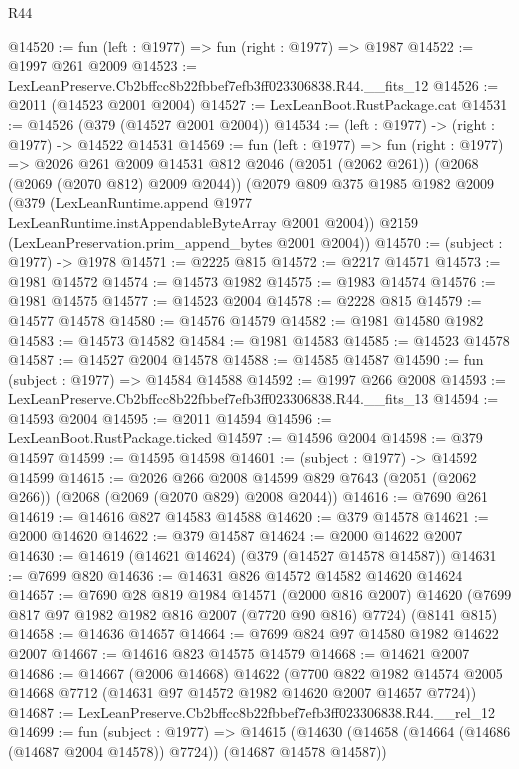 \begin{lexlean}{R44}
\begin{coremodule}
@14520 := fun (left : @1977) => fun (right : @1977) => @1987
@14522 := @1997 @261 @2009
@14523 := LexLeanPreserve.Cb2bffcc8b22fbbef7efb3ff023306838.R44.__fits_12
@14526 := @2011 (@14523 @2001 @2004)
@14527 := LexLeanBoot.RustPackage.cat
@14531 := @14526 (@379 (@14527 @2001 @2004))
@14534 := (left : @1977) -> (right : @1977) -> @14522 @14531
@14569 := fun (left : @1977) =>
  fun (right : @1977) =>
  @2026
    @261
    @2009
    @14531
    @812
    @2046
    (@2051 (@2062 @261))
    (@2068 (@2069 (@2070 @812) @2009 @2044))
    (@2079
      @809
      @375
      @1985
      @1982
      @2009
      (@379 (LexLeanRuntime.append @1977 LexLeanRuntime.instAppendableByteArray @2001 @2004))
      @2159
      (LexLeanPreservation.prim_append_bytes @2001 @2004))
@14570 := (subject : @1977) -> @1978
@14571 := @2225 @815
@14572 := @2217 @14571
@14573 := @1981 @14572
@14574 := @14573 @1982
@14575 := @1983 @14574
@14576 := @1981 @14575
@14577 := @14523 @2004
@14578 := @2228 @815
@14579 := @14577 @14578
@14580 := @14576 @14579
@14582 := @1981 @14580 @1982
@14583 := @14573 @14582
@14584 := @1981 @14583
@14585 := @14523 @14578
@14587 := @14527 @2004 @14578
@14588 := @14585 @14587
@14590 := fun (subject : @1977) => @14584 @14588
@14592 := @1997 @266 @2008
@14593 := LexLeanPreserve.Cb2bffcc8b22fbbef7efb3ff023306838.R44.__fits_13
@14594 := @14593 @2004
@14595 := @2011 @14594
@14596 := LexLeanBoot.RustPackage.ticked
@14597 := @14596 @2004
@14598 := @379 @14597
@14599 := @14595 @14598
@14601 := (subject : @1977) -> @14592 @14599
@14615 := @2026
    @266
    @2008
    @14599
    @829
    @7643
    (@2051 (@2062 @266))
    (@2068 (@2069 (@2070 @829) @2008 @2044))
@14616 := @7690 @261
@14619 := @14616 @827 @14583 @14588
@14620 := @379 @14578
@14621 := @2000 @14620
@14622 := @379 @14587
@14624 := @2000 @14622 @2007
@14630 := @14619 (@14621 @14624) (@379 (@14527 @14578 @14587))
@14631 := @7699 @820
@14636 := @14631 @826 @14572 @14582 @14620 @14624
@14657 := @7690
    @28
    @819
    @1984
    @14571
    (@2000 @816 @2007)
    @14620
    (@7699 @817 @97 @1982 @1982 @816 @2007 (@7720 @90 @816) @7724)
    (@8141 @815)
@14658 := @14636 @14657
@14664 := @7699 @824 @97 @14580 @1982 @14622 @2007
@14667 := @14616 @823 @14575 @14579
@14668 := @14621 @2007
@14686 := @14667
    (@2006 @14668)
    @14622
    (@7700 @822 @1982 @14574 @2005 @14668 @7712 (@14631 @97 @14572 @1982 @14620 @2007 @14657 @7724))
@14687 := LexLeanPreserve.Cb2bffcc8b22fbbef7efb3ff023306838.R44.__rel_12
@14699 := fun (subject : @1977) =>
  @14615 (@14630 (@14658 (@14664 (@14686 (@14687 @2004 @14578)) @7724)) (@14687 @14578 @14587))

\end{coremodule}
\end{lexlean}
